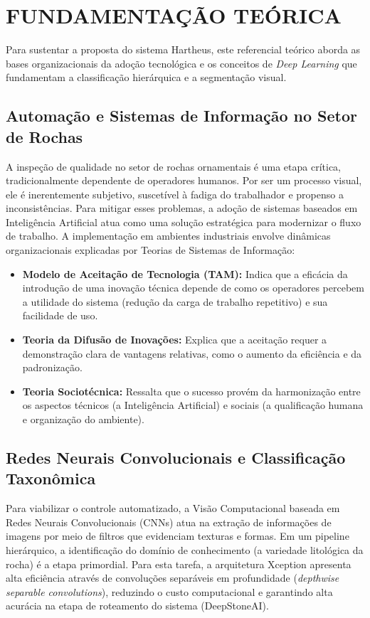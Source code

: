 \chapter[FUNDAMENTAÇÃO TEÓRICA]{FUNDAMENTAÇÃO TEÓRICA}

Para sustentar a proposta do sistema Hartheus, este referencial teórico aborda as bases organizacionais da adoção tecnológica e os conceitos de \textit{Deep Learning} que fundamentam a classificação hierárquica e a segmentação visual.

\section{Automação e Sistemas de Informação no Setor de Rochas}
A inspeção de qualidade no setor de rochas ornamentais é uma etapa crítica, tradicionalmente dependente de operadores humanos. Por ser um processo visual, ele é inerentemente subjetivo, suscetível à fadiga do trabalhador e propenso a inconsistências. Para mitigar esses problemas, a adoção de sistemas baseados em Inteligência Artificial atua como uma solução estratégica para modernizar o fluxo de trabalho. A implementação em ambientes industriais envolve dinâmicas organizacionais explicadas por Teorias de Sistemas de Informação:
\begin{itemize}
    \item \textbf{Modelo de Aceitação de Tecnologia (TAM):} Indica que a eficácia da introdução de uma inovação técnica depende de como os operadores percebem a utilidade do sistema (redução da carga de trabalho repetitivo) e sua facilidade de uso.
    \item \textbf{Teoria da Difusão de Inovações:} Explica que a aceitação requer a demonstração clara de vantagens relativas, como o aumento da eficiência e da padronização.
    \item \textbf{Teoria Sociotécnica:} Ressalta que o sucesso provém da harmonização entre os aspectos técnicos (a Inteligência Artificial) e sociais (a qualificação humana e organização do ambiente).
\end{itemize}

\section{Redes Neurais Convolucionais e Classificação Taxonômica}
Para viabilizar o controle automatizado, a Visão Computacional baseada em Redes Neurais Convolucionais (CNNs) atua na extração de informações de imagens por meio de filtros que evidenciam texturas e formas. Em um pipeline hierárquico, a identificação do domínio de conhecimento (a variedade litológica da rocha) é a etapa primordial. Para esta tarefa, a arquitetura Xception apresenta alta eficiência através de convoluções separáveis em profundidade (\textit{depthwise separable convolutions}), reduzindo o custo computacional e garantindo alta acurácia na etapa de roteamento do sistema (DeepStoneAI).

